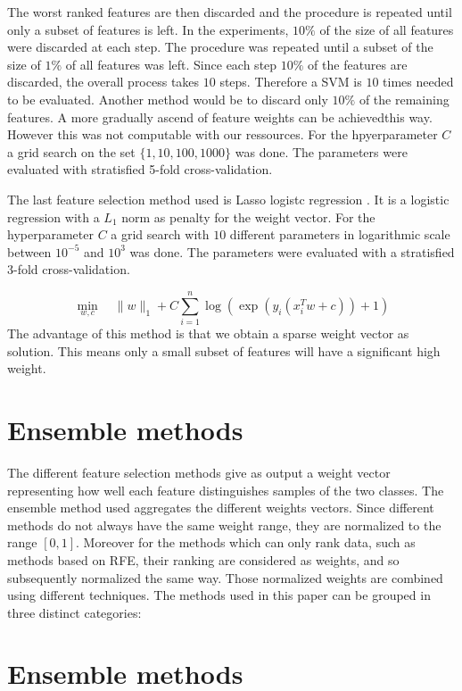 \documentclass[twoside,11pt]{article}
\begin{document}
The worst ranked features are then discarded and the procedure is repeated until only a subset of features is left. In the experiments, $10\%$ of the size of all features were discarded at each step. The procedure was repeated until a subset of the size of $1\%$ of all features was left. Since each step $10\%$ of the features are discarded, the overall process takes $10$ steps. Therefore a SVM is $10$ times needed to be evaluated. Another method would be to discard only $10\%$ of the remaining features. A more gradually ascend of feature weights can be achievedthis way. However this was not computable with our ressources. For the hpyerparameter $C$ a grid search on the set $\{1, 10, 100, 1000\}$ was done. The parameters were evaluated with stratisfied 5-fold cross-validation.

The last feature selection method used is Lasso logistc regression \citep{wheeler2010lasso}. It is a logistic regression with a $L_1$ norm as penalty for the weight vector. For the hyperparameter $C$ a grid search with $10$ different parameters in logarithmic scale between $10^{-5}$ and $10^3$ was done. The parameters were evaluated with a stratisfied 3-fold cross-validation.

\begin{equation}
    \min_{w,c} \quad \|w\|_1 + C\sum_{i=1}^n \log(\exp(y_i(x_i^Tw + c))+1)
  \end{equation}
  The advantage of this method is that we obtain a sparse weight vector as solution. This means only a small subset of features will have a significant high weight.
  \section{Ensemble methods}
  The different feature selection methods give as output a weight vector representing how well each feature distinguishes samples of the two classes. The ensemble method used aggregates the different weights vectors. Since different methods do not always have the same weight range, they are normalized to the range $[0,1]$. Moreover for the methods which can only rank data, such as methods based on RFE, their ranking are considered as weights, and so subsequently normalized the same way. 
  Those normalized weights are combined using different techniques. The methods used in this paper can be grouped in three distinct categories: 

\section{Ensemble methods}
\end{document}
